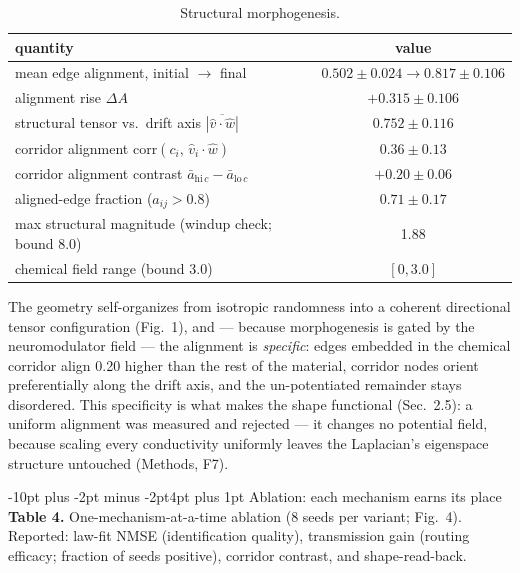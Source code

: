 \documentclass[10pt]{article}
\makeatletter
\renewcommand\subsection{\@startsection{subsection}{2}{\z@}%
  {-10pt plus -2pt minus -2pt}{4pt plus 1pt}%
  {\normalfont\bfseries\normalsize}}
\makeatother
\begin{document}
\begin{table}[h]
\centering\small
\caption{Structural morphogenesis.}
\begin{tabular}{lc}
\toprule
quantity & value \\
\midrule
mean edge alignment, initial $\to$ final & $0.502 \pm 0.024 \to 0.817 \pm 0.106$ \\
alignment rise $\Delta A$ & $+0.315 \pm 0.106$ \\
structural tensor vs.\ drift axis $\overline{|\hat v \cdot \hat w|}$ & $0.752 \pm 0.116$ \\
corridor alignment $\mathrm{corr}(c_i,\, \hat v_i \cdot \hat w)$ & $0.36 \pm 0.13$ \\
corridor alignment contrast $\bar a_{\mathrm{hi\,}c} - \bar a_{\mathrm{lo\,}c}$ & $+0.20 \pm 0.06$ \\
aligned-edge fraction ($a_{ij} > 0.8$) & $0.71 \pm 0.17$ \\
max structural magnitude (windup check; bound 8.0) & 1.88 \\
chemical field range (bound 3.0) & $[0, 3.0]$ \\
\bottomrule
\end{tabular}
\end{table}

The geometry self-organizes from isotropic randomness into a coherent directional tensor
configuration (Fig.~1), and --- because morphogenesis is gated by the neuromodulator
field --- the alignment is \emph{specific}: edges embedded in the chemical corridor
align 0.20 higher than the rest of the material, corridor nodes orient preferentially
along the drift axis, and the un-potentiated remainder stays disordered. This
specificity is what makes the shape functional (Sec.~2.5): a uniform alignment was
measured and rejected --- it changes no potential field, because scaling every
conductivity uniformly leaves the Laplacian's eigenspace structure untouched
(Methods, F7).

\subsection{Ablation: each mechanism earns its place}
\textbf{Table 4.} One-mechanism-at-a-time ablation (8 seeds per variant; Fig.~4).
Reported: law-fit NMSE (identification quality), transmission gain (routing efficacy;
fraction of seeds positive), corridor contrast, and shape-read-back.
\end{document}
